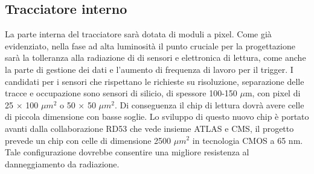 \subsection{Tracciatore interno}
La parte interna del tracciatore sarà dotata di moduli a pixel. Come già evidenziato, nella fase ad alta luminosità il punto cruciale per la progettazione sarà la tolleranza alla radiazione di di sensori e elettronica di lettura, come anche la parte di gestione dei dati e l'aumento di frequenza di lavoro per il trigger. 
I candidati per i sensori che  rispettano le richieste su risoluzione, separazione delle tracce e occupazione sono sensori di silicio, di spessore 100-150 $\mu$m, con pixel di 25 $\times$ 100 $\mu m^2$ o 50 $\times$ 50 $\mu m^2$. 
Di conseguenza il chip di lettura dovrà avere celle di piccola dimensione con basse soglie. Lo sviluppo di questo nuovo chip è portato avanti dalla collaborazione RD53 che vede insieme ATLAS e CMS, il progetto prevede un chip con celle di dimensione 2500 $\mu m^2$  in tecnologia CMOS a 65 nm. 
Tale configurazione dovrebbe consentire una migliore resistenza al danneggiamento da radiazione.

